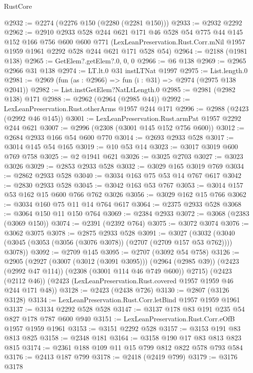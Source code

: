 \begin{lexlean}{RustCore}
\begin{coremodule}
@2932 := @2274 (@2276 @150 (@2280 (@2281 @150)))
@2933 := @2932 @2292
@2962 := @2910
    @2933
    @528
    @244
    @621
    @171
    @46
    @528
    @54
    @775
    @44
    @145
    @152
    @166
    @756
    @600
    @600
    @771
    (LexLeanPreservation.Rust.Corr.mNil @1957 @1959 @1961 @2292 @528 @244 @621 @171 @528 @54)
@2964 := @2188 (@1981 @138)
@2965 := GetElem?.getElem?.{0, 0, 0}
@2966 := @6 @138
@2969 := @2965 @2966 @31 @138
@2974 := LT.lt.{0} @31 instLTNat @1997
@2975 := List.length.{0}
@2981 := @2969 (fun (as : @2966) => fun (i : @31) => @2974 (@2975 @138 @2041))
@2982 := List.instGetElem?NatLtLength.{0}
@2985 := @2981 (@2982 @138) @171
@2988 := @2962 (@2964 (@2985 @44))
@2992 := LexLeanPreservation.Rust.otherArms @1957 @244 @171
@2996 := @2988 (@2423 (@2992 @46 @145))
@3001 := LexLeanPreservation.Rust.armPat @1957 @2292 @244 @621
@3007 := @2996 (@2308 (@3001 @145 @152 @756 @600))
@3012 := @2684 @2933 @166 @54 @600 @770
@3014 := @2693 @2933 @528
@3017 := @3014 @145 @54 @165
@3019 := @10 @53 @14
@3023 := @3017 @3019 @600 @769 @758
@3025 := @2 @1941 @621
@3026 := @3025 @2703
@3027 := @3023 @3026
@3029 := @2853 @2933 @528
@3032 := @3029 @165 @3019 @769
@3034 := @2862 @2933 @528
@3040 := @3034 @163 @75 @53 @14 @767 @617
@3042 := @2830 @2933 @528
@3045 := @3042 @163 @53 @767
@3053 := @3014 @157 @53 @162 @15 @600 @766 @762 @3026
@3056 := @3029 @162 @15 @766
@3062 := @3034 @160 @75 @11 @14 @764 @617
@3064 := @2375 @2933 @528
@3068 := @3064 @150 @11 @150 @764
@3069 := @2384 @2933
@3072 := @3068 (@2383 (@3069 @150))
@3074 := @2391 (@2392 @764)
@3075 := @3072 @3074
@3076 := @3062 @3075
@3078 := @2875 @2933 @528
@3091 := @3027
    (@3032 (@3040 (@3045 (@3053 (@3056 (@3076 @3078)) (@2707 (@2709 @157 @53 @762)))) @3078))
@3092 := @2709 @145
@3095 := @2707 (@3092 @54 @758)
@3126 := @2905
    (@2927
      (@3007 (@3012 (@3091 @3095)))
      (@2964 (@2985 @39))
      (@2423 (@2992 @47 @114))
      (@2308 (@3001 @114 @46 @749 @600))
      @2715)
    (@2423 (@2112 @46))
    (@2423 (LexLeanPreservation.Rust.covered @1957 @1959 @46 @244 @171 @48))
@3128 := @2423 (@2438 @726)
@3130 := @2807 (@3126 @3128)
@3134 := LexLeanPreservation.Rust.Corr.letBind @1957 @1959 @1961
@3137 := @3134 @2292 @528 @528
@3147 := @3137 @178 @83 @191 @235 @54 @827 @178 @787 @600 @940
@3151 := LexLeanPreservation.Rust.Corr.eOfB @1957 @1959 @1961
@3153 := @3151 @2292 @528
@3157 := @3153 @191 @83 @813 @825
@3158 := @2348 @181
@3164 := @3158 @190 @17 @83 @813 @823 @815
@3174 := @2361 @188 @109 @11 @15 @799 @812 @822 @578 @793 @584
@3176 := @2413 @187 @799
@3178 := @2418 (@2419 @799)
@3179 := @3176 @3178

\end{coremodule}
\end{lexlean}
